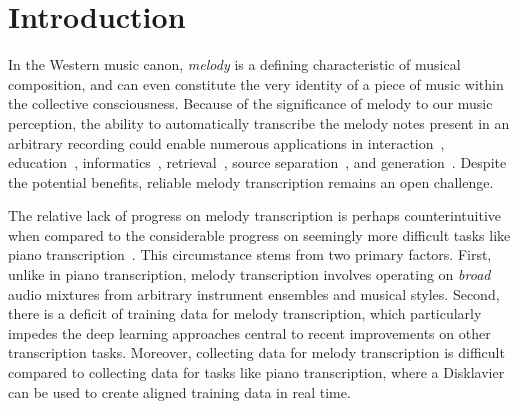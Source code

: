 \section{Introduction}\label{sec:introduction}

In the Western music canon, 
\emph{melody} is a defining characteristic of musical composition, 
and can even constitute the very identity of a piece of music within the collective consciousness. 
Because of the significance of melody to our music perception, 
the ability to automatically transcribe the melody notes present in an arbitrary recording 
could enable numerous applications in 
interaction~\cite{ryynanen2008accompaniment}, 
education~\cite{droe2006music}, 
informatics~\cite{bainbridge1999towards}, 
retrieval~\cite{ghias1995query}, 
source separation~\cite{ewert2014score},
and generation~\cite{hawthorne2019enabling}.
Despite the potential benefits, 
reliable melody transcription remains an open challenge.%

The relative lack of progress on melody transcription is perhaps counterintuitive when compared to the considerable progress on seemingly more difficult tasks like piano transcription~\cite{sigtia2016end,hawthorne2017onsets}.
This circumstance stems from two primary factors.
First, unlike in piano transcription, melody transcription involves operating on \emph{broad}
audio mixtures from arbitrary instrument ensembles and musical styles. 
Second, there is a deficit of training data for melody transcription, which particularly impedes the deep learning approaches central to recent improvements on other transcription tasks. 
Moreover, collecting data for melody transcription is difficult compared to collecting data for tasks like piano transcription, where a Disklavier can be used to create aligned training data in real time. 

